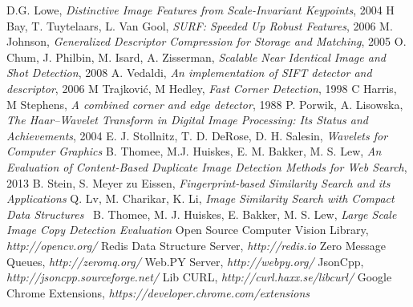 \documentclass[a4paper,5pt]{thesis.cs.pub.ro}
\begin{document}
\begin{thebibliography}{16}

D.G. Lowe, \emph{Distinctive Image Features from Scale-Invariant Keypoints}, 2004
H Bay, T. Tuytelaars, L. Van Gool, \emph{SURF: Speeded Up Robust Features}, 2006
M. Johnson, \emph{Generalized Descriptor Compression for Storage and Matching}, 2005
O. Chum, J. Philbin, M. Isard, A. Zisserman, \emph{Scalable Near Identical Image and Shot Detection}, 2008
A. Vedaldi, \emph{An implementation of SIFT detector and descriptor}, 2006
M Trajković, M Hedley, \emph{Fast Corner Detection}, 1998
C Harris, M Stephens, \emph{A combined corner and edge detector}, 1988
P. Porwik, A. Lisowska, \emph{The Haar–Wavelet Transform in Digital Image Processing: Its Status and Achievements}, 2004
E. J. Stollnitz, T. D. DeRose, D. H. Salesin, \emph{Wavelets for Computer Graphics}
B. Thomee, M.J. Huiskes, E. M. Bakker, M. S. Lew, \emph{An Evaluation of Content-Based Duplicate Image Detection Methods for Web Search}, 2013
B. Stein, S. Meyer zu Eissen, \emph{Fingerprint-based Similarity Search and its Applications}
Q. Lv, M. Charikar, K. Li, \emph{Image Similarity Search with Compact Data Structures}\
B. Thomee, M. J. Huiskes, E. Bakker, M. S. Lew, \emph{Large Scale Image Copy Detection Evaluation}
\bibitem{opencv}
Open Source Computer Vision Library, \emph{http://opencv.org/}
Redis Data Structure Server, \emph{http://redis.io}
Zero Message Queues, \emph{http://zeromq.org/}
Web.PY Server, \emph{http://webpy.org/}
JsonCpp, \emph{http://jsoncpp.sourceforge.net/}
Lib CURL, \emph{http://curl.haxx.se/libcurl/}
Google Chrome Extensions, \emph{https://developer.chrome.com/extensions}
\end{thebibliography}
\end{document}
